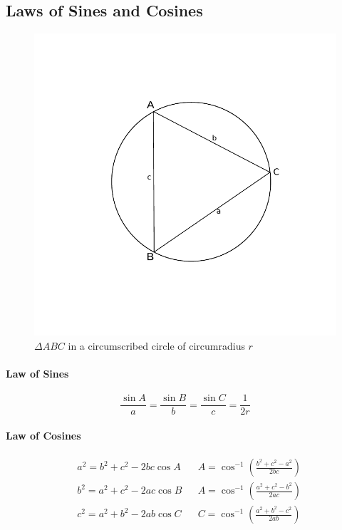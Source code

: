\documentclass[12pt]{article}
\begin{document}
\subsection{Laws of Sines and Cosines}
\begin{figure}[H]
	\centering
	\includegraphics[scale=1]{figures/triangle}
	\caption{\label{triangle}$\Delta ABC$ in a circumscribed circle of circumradius $r$}
\end{figure}
\paragraph{Law of Sines}
$$\frac{\sin A}{a} = \frac{\sin B}{b} = \frac{\sin C}{c} = \frac{1}{2r}$$ 
\paragraph{Law of Cosines}
\begin{align*}
&a^2 = b^2 + c^2 - 2bc\cos A & &A =\cos^{-1}{\left(\frac{b^2 + c^2 - a^2}{2bc}\right)} \\
&b^2 = a^2 + c^2 - 2ac\cos B & &A =\cos^{-1}{\left(\frac{a^2 + c^2 - b^2}{2ac}\right)} \\
&c^2 = a^2 + b^2 - 2ab\cos C & &C =\cos^{-1}{\left(\frac{a^2 + b^2 - c^2}{2ab}\right)} \\
\end{align*}
\end{document}
